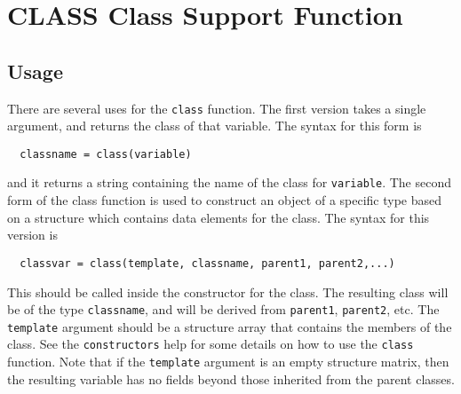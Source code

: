 \section{CLASS Class Support Function}

\subsection{Usage}

There are several uses for the \verb|class| function.  The first
version takes a single argument, and returns the class of
that variable.  The syntax for this form is
\begin{verbatim}
  classname = class(variable)
\end{verbatim}
and it returns a string containing the name of the class for
\verb|variable|.  The second form of the class function is used
to construct an object of a specific type based on a structure
which contains data elements for the class.  The syntax for
this version is
\begin{verbatim}
  classvar = class(template, classname, parent1, parent2,...)
\end{verbatim}
This should be called inside the constructor for the class.
The resulting class will be of the type \verb|classname|, and will
be derived from \verb|parent1|, \verb|parent2|, etc.  The \verb|template|
argument should be a structure array that contains the members
of the class.  See the \verb|constructors| help for some details
on how to use the \verb|class| function.  Note that if the
\verb|template| argument is an empty structure matrix, then the
resulting variable has no fields beyond those inherited from
the parent classes.
